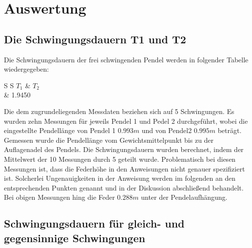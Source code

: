 \section{Auswertung}
  \subsection{Die Schwingungsdauern T1 und T2}
      Die Schwingungsdauern der frei schwingenden Pendel werden in folgender Tabelle wiedergegeben:
        \begin{table}
          \centering
            \caption{freie Schwingungsdauern T1 und T2.}
            \label{tab:aufgabe1}
            \begin{tabular}{S S}
              \toprule
              {$T_{1}$} & {$T_{2}$} \\
               &     1.9450 \\
              \bottomrule
            \end{tabular}
          \end{table}
       Die dem zugrundeliegenden Messdaten beziehen sich auf 5 Schwingungen. Es wurden zehn Messungen für jeweils Pendel 1
       und Pedel 2 durchgeführt, wobei die eingestellte Pendellänge von Pendel 1 $0.993m$ und von Pendel2 $0.995m$ beträgt.
       Gemessen wurde die Pendellänge vom Gewichtsmittelpunkt bis zu der Auflagenadel des Pendels. Die  Schwingungsdauern
       wurden berechnet, indem der Mittelwert der 10 Messungen durch 5 geteilt wurde.
       Problematisch bei diesen Messungen ist, dass die Federhöhe in den Anweisungen nicht genauer spezifiziert ist.
       Solcherlei Ungenauigkeiten in der Anweisung werden im folgenden an den entsprechenden Punkten genannt und in der
       Diskussion abschließend behandelt. Bei obigen Messungen hing die Feder $0.288m$ unter der Pendelaufhängung.
  \subsection{Schwingungsdauern für gleich- und gegensinnige Schwingungen}
  
\label{sec:Auswertung}
